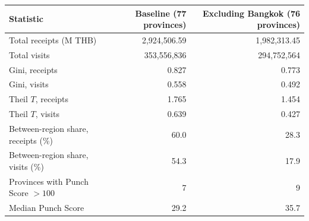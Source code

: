 \begin{tabular}{lrr}
\toprule
Statistic & Baseline (77 provinces) & Excluding Bangkok (76 provinces) \\
\midrule
Total receipts (M THB) & 2,924,506.59 & 1,982,313.45 \\
Total visits & 353,556,836 & 294,752,564 \\
Gini, receipts & 0.827 & 0.773 \\
Gini, visits & 0.558 & 0.492 \\
Theil $T$, receipts & 1.765 & 1.454 \\
Theil $T$, visits & 0.639 & 0.427 \\
Between-region share, receipts (\%) & 60.0 & 28.3 \\
Between-region share, visits (\%) & 54.3 & 17.9 \\
Provinces with Punch Score $>100$ & 7 & 9 \\
Median Punch Score & 29.2 & 35.7 \\
\bottomrule
\end{tabular}
